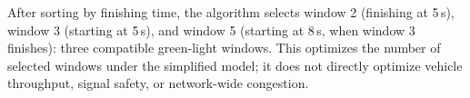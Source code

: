 After sorting by finishing time, the algorithm selects
window 2 (finishing at 5\,s), window 3 (starting at
5\,s), and window 5 (starting at 8\,s, when window 3
finishes): three compatible green-light windows.
This optimizes the number of selected windows under the
simplified model; it does not directly optimize vehicle
throughput, signal safety, or network-wide congestion.
